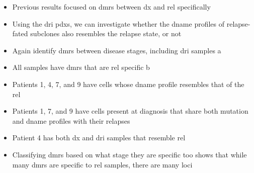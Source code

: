 \begin{itemize}
  \item Previous results focused on \glspl{dmr} between \gls{dx} and \gls{rel} specifically
  \item Using the \gls{dri} \glspl{pdx}, we can investigate whether the \gls{dname} profiles of relapse-fated subclones also resembles the relapse state, or not
  \item Again identify \glspl{dmr} between disease stages, including \gls{dri} samples a
  \item All samples have \glspl{dmr} that are \Gls{rel} specific b
  \item Patients 1, 4, 7, and 9 have cells whose \gls{dname} profile resembles that of the \gls{rel}
  \item Patients 1, 7, and 9 have cells present at diagnosis that share both mutation and \gls{dname} profiles with their relapses
  \item Patient 4 has both \gls{dx} and \gls{dri} samples that resemble \gls{rel}
  \item Classifying \glspl{dmr} based on what stage they are specific too shows that while many \glspl{dmr} are specific to \gls{rel} samples, there are many loci 
\end{itemize}

